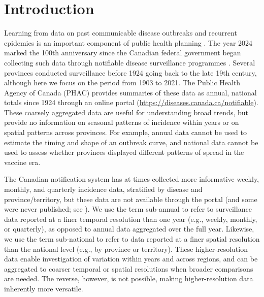 \documentclass[12pt]{article}
\begin{document}
\newpage

\section{Introduction}\label{sec:intro}

Learning from data on past communicable disease outbreaks and recurrent epidemics is an important component of public health planning \cite{AndeMay91,Earn+00,BaucEarn03,HempEarn15,ogden2024mathematical}. The year 2024 marked the 100th anniversary since the Canadian federal government began collecting such data through notifiable disease surveillance programmes \cite{summaryNotifiable1954,sockett1996communicable,carter1991establishing,doherty2000establishing,totten2019updates}. Several provinces conducted surveillance before 1924 going back to the late 19th century, although here we focus on the period from 1903 to 2021. The Public Health Agency of Canada (PHAC) provides summaries of these data as annual, national totals since 1924 through an online portal (\url{https://diseases.canada.ca/notifiable}). These coarsely aggregated data are useful for understanding broad trends, but provide no information on seasonal patterns of incidence within years or on spatial patterns across provinces. For example, annual data cannot be used to estimate the timing and shape of an outbreak curve, and national data cannot be used to assess whether provinces displayed different patterns of spread in the vaccine era.

The Canadian notification system has at times collected more informative weekly, monthly, and quarterly incidence data, stratified by disease and province/territory, but these data are not available through the portal (and some were never published; see \cite{summaryNotifiable1954}). We use the term sub-annual to refer to surveillance data reported at a finer temporal resolution than one year (e.g., weekly, monthly, or quarterly), as opposed to annual data aggregated over the full year. Likewise, we use the term sub-national to refer to data reported at a finer spatial resolution than the national level (e.g., by province or territory). These higher-resolution data enable investigation of variation within years and across regions, and can be aggregated to coarser temporal or spatial resolutions when broader comparisons are needed. The reverse, however, is not possible, making higher-resolution data inherently more versatile.
\end{document}
